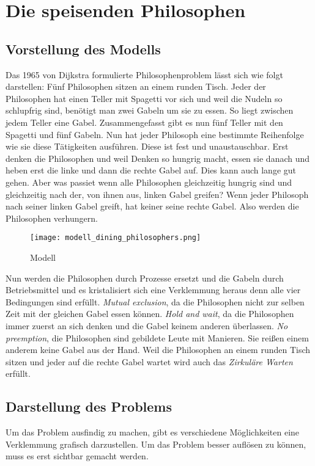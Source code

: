 \chapter{Die speisenden Philosophen}
\label{speisende_philosophen}
\section{Vorstellung des Modells}
\label{vorstellung}
Das 1965 von Dijkstra formulierte Philosophenproblem lässt sich wie folgt darstellen: Fünf Philosophen sitzen an einem runden Tisch. Jeder der Philosophen hat einen Teller mit Spagetti vor sich und weil die Nudeln so schlupfrig sind, benötigt man zwei Gabeln um sie zu essen. So liegt zwischen jedem Teller eine Gabel. Zusammengefasst gibt es nun fünf Teller mit den Spagetti und fünf Gabeln. Nun hat jeder Philosoph eine bestimmte Reihenfolge wie sie diese Tätigkeiten ausführen. Diese ist fest und unaustauschbar. Erst denken die Philosophen und weil Denken so hungrig macht, essen sie danach und heben erst die linke und dann die rechte Gabel auf. Dies kann auch lange gut gehen. Aber was passiet wenn alle Philosophen gleichzeitig hungrig sind und gleichzeitig nach der, von ihnen aus, linken Gabel greifen? Wenn jeder Philosoph nach seiner linken Gabel greift, hat keiner seine rechte Gabel. Also werden die Philosophen verhungern.\parencite[vgl.][S.220]{tanenbaum2016} 

\begin{figure}[H]
\caption{Modell \parencite{philosophers}}
\label{fig:modell}
\centering
\texttt{[image: modell\_dining\_philosophers.png]}
\end{figure}

Nun werden die Philosophen durch Prozesse ersetzt und die Gabeln durch Betriebsmittel und es kristalisiert sich eine Verklemmung heraus denn alle vier Bedingungen sind erfüllt. \textit{Mutual exclusion}, da die Philosophen nicht zur selben Zeit mit der gleichen Gabel essen können. \textit{Hold and wait}, da die Philosophen immer zuerst an sich denken und die Gabel keinem anderen überlassen. \textit{No preemption}, die Philosophen sind gebildete Leute mit Manieren. Sie reißen einem anderem keine Gabel aus der Hand. Weil die Philosophen an einem runden Tisch sitzen und jeder auf die rechte Gabel wartet wird auch das \textit{Zirkuläre Warten} erfüllt.

\section{Darstellung des Problems}
\label{problem}
Um das Problem ausfindig zu machen, gibt es verschiedene Möglichkeiten eine Verklemmung grafisch darzustellen. Um das Problem besser auflösen zu können, muss es erst sichtbar gemacht werden.

